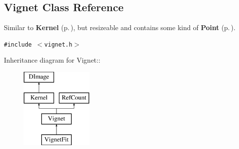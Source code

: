 \subsection{Vignet  Class Reference}
\label{class_vignet}
Similar to {\bf Kernel} {\rm (p.\,\pageref{class_kernel})}, but resizeable and contains some kind of {\bf Point} {\rm (p.\,\pageref{class_point})}. 


{\tt \#include $<$vignet.h$>$}

Inheritance diagram for Vignet::\begin{figure}[H]
\begin{center}
\leavevmode
\includegraphics[height=4cm]{class_vignet}
\end{center}
\end{figure}
